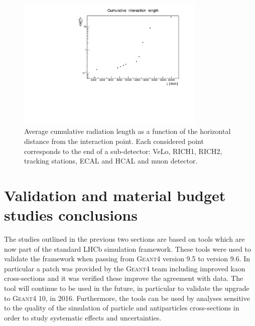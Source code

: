 \begin{figure}[t]
\centering \includegraphics[width=0.8\textwidth]{Detector/figs/validation/radlenght/cuminterLength_vs_Z.pdf}
\caption{Average cumulative radiation length as a function of the horizontal 
distance from the interaction point. Each considered point corresponds to the end of a sub-detector:
VeLo, RICH1, RICH2, tracking stations, ECAL and HCAL and muon detector. }
\label{fig:cumradlZ}
\end{figure}


\section{Validation and material budget studies conclusions}
\label{sec:radlength_conlsusions}
The studies outlined in the previous two sections are based on tools which are now 
part of the standard LHCb simulation framework. These tools were used to validate 
the framework when passing from \textsc{Geant4} version 9.5 to version 9.6.
In particular a patch was provided by the \textsc{Geant4} team including
improved kaon cross-sections and it was verified these improve the agreement with data.
The tool will continue to be used in the future,
in particular to validate the upgrade to \textsc{Geant4} 10, in 2016.
Furthermore, the tools can be used by analyses sensitive to the quality of the simulation 
of particle and antiparticles cross-sections in order to study systematic effects and uncertainties.



